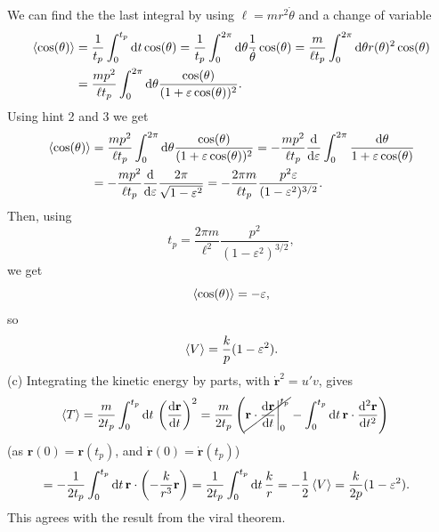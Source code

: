 \documentclass{article}
\begin{document}
        We can find the the last integral by using $\ell = m r^2 \dot \theta$ and a change of variable
        \begin{align*}
            \expval{\cos(\theta)} & = \frac{1}{t_p}  \int_0^{t_p} \dd t \cos(\theta) 
            = \frac{1}{t_p}  \int_0^{2 \pi} \dd \theta \frac{1}{\dot \theta} \cos(\theta) = \frac{m }{\ell t_p} \int_0^{2 \pi} \dd \theta r(\theta)^2 \cos(\theta) \\
            &= \frac{m p^2}{\ell t_p} \int_0^{2 \pi} \dd \theta \frac{\cos(\theta) }{(1 + \varepsilon \cos(\theta))^2}.
        \end{align*}
        Using hint 2 and 3 we get
        \begin{align*}
            \expval{\cos(\theta)} & = \frac{m p^2}{\ell t_p} \int_0^{2 \pi} \dd \theta \frac{\cos(\theta) }{(1 + \varepsilon \cos(\theta))^2} 
            = - \frac{m p^2}{\ell t_p} \dv{\varepsilon} \int_0^{2\pi} \frac{\dd \theta}{1 + \varepsilon \cos(\theta)} \\
                & = - \frac{m p^2}{\ell t_p}\dv{\varepsilon} \frac{2 \pi}{\sqrt{1 - \varepsilon^2}} = - \frac{2 \pi m}{\ell t_p}  \frac{ p^2 \varepsilon}{(1 - \varepsilon^2)^{3/2}}.
        \end{align*}
        Then, using 
        \begin{equation*}
            t_p =  \frac{2 \pi m}{\ell^2} \frac{p^2}{(1 - \varepsilon^2)^{3/2}},
        \end{equation*}
        we get
        \begin{equation*}
            \expval{\cos(\theta)} = - \varepsilon,
        \end{equation*}
        so
        \begin{equation*}
            \expval{V} = \frac{k}{p}(1 - \varepsilon^2).
        \end{equation*}
        (c) Integrating the  kinetic energy by parts, with $\mathbf{\dot r}^2 = u' v$, gives 
        \begin{align*}
            \expval{T} & = \frac{m}{2 t_p}   \int_0^{t_p} \dd t \, \left(\dv{\mathbf{r}}{t}\right)^2 
            = \frac{m}{2 t_p} \left(\cancel{\mathbf{r} \cdot \dv{\mathbf{r}}{t}\bigg|_0^{t_p} } -   \int_0^{t_p} \dd t \, \mathbf{r} \cdot\dv[2]{\mathbf{r}}{t}\right)
        \end{align*}
        (as $\mathbf{r}(0) = \mathbf{r}(t_p)$, and $\mathbf{\dot r}(0) = \mathbf{\dot r}(t_p)$)
        \begin{align*}
            &  = - \frac{1}{2 t_p} \int_0^{t_p} \dd t \, \mathbf{r} \cdot \left(- \frac{k}{r^3} \mathbf{r}\right) = \frac{1}{2 t_p} \int_0^{t_p} \dd t \, \frac{k}{r} = - \frac{1}{2} \expval{V} = \frac{k}{2p}(1 - \varepsilon^2).
        \end{align*}
        This agrees with the result from the viral theorem.
\end{document}
